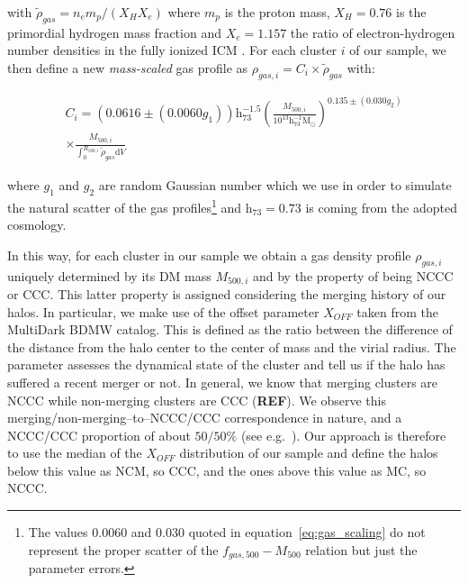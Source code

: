 \documentclass[traditabstract]{aa}
\newcommand{\rmn}{\mathrm}
\begin{document}
with $\tilde{\rho}_{gas} = n_{e} m_{p} / ( X_{H}X_{e} )$ where $m_{p}$ is the proton mass, $X_{H} = 0.76$ is the primordial hydrogen mass fraction and $X_{e} = 1.157$ the ratio of electron-hydrogen number densities in the fully ionized ICM \citep{1988xrec.book.....S}. For each cluster $i$ of our sample, we then define a new \emph{mass-scaled} gas profile as $\rho_{gas,i}=C_{i} \times \tilde{\rho}_{gas}$ with:

\begin{eqnarray}
C_{i}  =  (0.0616\pm(0.0060g_{1}))  \rmn{h}_{\rmn{73}}^{-1.5}  \left(\frac{M_{500,i}}{10^{13}\rmn{h}_{\rmn{73}}^{-1}\rmn{M_{\odot}}}\right)^{0.135\pm(0.030g_{2})} \nonumber \\
 \times  \frac{M_{500,i}}{\int_{0}^{R_{500,i}} \tilde{\rho}_{gas} \rmn{d}V}
\label{eq:gas_scaling}
\end{eqnarray}
 
where $g_{1}$ and $g_{2}$ are random Gaussian number which we use in order to simulate the natural scatter of the gas profiles\footnote[4]{The values $0.0060$ and $0.030$ quoted in equation~\ref{eq:gas_scaling} do not represent the proper scatter of the $f_{gas,500}-M_{500}$ relation but just the parameter errors.} and h$_{73} = 0.73$ is coming from the \cite{2009ApJ...693.1142S} adopted cosmology. 

In this way, for each cluster in our sample we obtain a gas density profile $\rho_{gas,i}$ uniquely determined by its DM mass $M_{500,i}$ and by the property of being NCCC or CCC. This latter property is assigned considering the merging history of our halos. In particular, we make use of the offset parameter $X_{OFF}$ taken from the MultiDark BDMW catalog. This is defined as the ratio between the difference of the distance from the halo center to the center of mass and the virial radius. The parameter assesses the dynamical state of the cluster and tell us if the halo has suffered a recent merger or not. In general, we know that merging clusters are NCCC while non-merging clusters are CCC ({\bf REF}). 
We observe this merging/non-merging--to--NCCC/CCC correspondence in nature, and a NCCC/CCC proportion of about $50/50\%$ (see e.g.~\citealp{2007A&A...466..805C,2009MNRAS.395..764S}). Our approach is therefore to use the median of the $X_{OFF}$ distribution of our sample and define the halos below this value as NCM, so CCC, and the ones above this value as MC, so NCCC.
\end{document}
